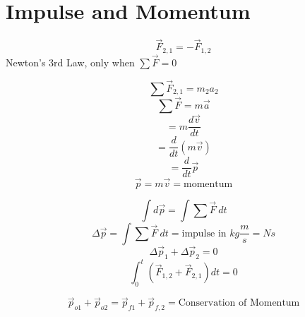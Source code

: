 \documentclass[fleqn]{article}
\begin{document}
\setlength{\mathindent}{0pt}
\section*{Impulse and Momentum}
\[ \vec{F}_{2,1}=-\vec{F}_{1,2}     \]
Newton's 3rd Law, only when $\sum \vec{F}=0 $

\[ \sum \vec{F}_{2,1}=m_2a_2  \]
\[ \sum \vec{F}=m \vec{a}   \]
\[ =m \frac{d \vec{v} }{dt}  \]
\[ =\frac{d}{dt} (m \vec{v} ) \]
\[ =\frac{d}{dt} \vec{p}  \]
\[ \vec{p} =m \vec{v} = \text{momentum}  \]

\[ \int{d \vec{p} } = \int{\sum \vec{F} }\ dt\]
\[ \Delta \vec{p}= \int{\sum \vec{F} }\ dt = \text{impulse in } kg \frac{m}{s} =Ns \]
\[ \Delta \vec{p} _1  +\Delta \vec{p}_{2} = 0  \]
\[ \int_{0}^{t} \left( \vec{F} _{1,2} + \vec{F} _{2,1}  \right) dt = 0 \]

\[ \vec{p} _{o1} + \vec{p} _{o2} = \vec{p} _{f1} + \vec{p} _{f, 2} = \text{Conservation of Momentum}  \]
\end{document}
